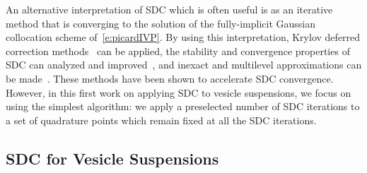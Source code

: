An alternative interpretation of SDC which is often useful is as an
iterative method that is converging to the solution of the
fully-implicit Gaussian collocation scheme of~\eqref{e:picardIVP}.  By
using this interpretation, Krylov deferred correction
methods~\cite{hua:jia:min2006, jia:hua2008, bu:hua:min2009,
bu:hua:min2012, hua:jia:min2007} can be applied, the stability and
convergence properties of SDC can analyzed and improved~\cite{wei2013},
and inexact and multilevel approximations can be
made~\cite{spe:rup:emm:bol:kra2014, emm:min2012,
min:spe:bol:emm:rup2015, spe:rup:emm:min:bol:kra2014,
spe:rup:min:emm:kra2014}.  These methods have been shown to accelerate
SDC convergence.  However, in this first work on applying SDC to
vesicle suspensions, we focus on using the simplest algorithm: we apply
a preselected number of SDC iterations to a set of quadrature points
which remain fixed at all the SDC iterations.

\subsection{SDC for Vesicle Suspensions}

